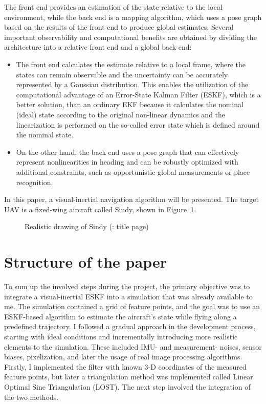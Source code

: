 The front end provides an estimation of the state relative to the local environment, while the back end is a mapping algorithm, which uses a pose graph based on the results of the front end to produce global estimates. Several important observability and computational benefits are obtained by dividing the architecture into a relative front end and a global back end:
\begin{itemize}
    \item 
    The front end calculates the estimate relative to a local frame, where the states can remain observable and the uncertainty can be accurately represented by a Gaussian distribution. This enables the utilization of the computational advantage of an Error-State Kalman Filter (ESKF), which is a better solution, than an ordinary EKF because it calculates the nominal (ideal) state according to the original non-linear dynamics and the linearization is performed on the so-called error state which is defined around the nominal state.
    
    \item 
     On the other hand, the back end uses a pose graph that can effectively represent nonlinearities in heading and can be robustly optimized with additional constraints, such as opportunistic global measurements or place recognition.
\end{itemize}

In this paper, a visual-inertial navigation algorithm will be presented. The target UAV is a fixed-wing aircraft called Sindy, shown in Figure~\ref{fig:sindy}.

\begin{figure}[!ht]
    \centering
    
    \caption{Realistic drawing of Sindy (\cite{sindy-manual}: title page)}\label{fig:sindy}
\end{figure}

\section{Structure of the paper}

To sum up the involved steps during the project, the primary objective was to integrate a visual-inertial ESKF into a simulation that was already available to me. The simulation contained a grid of feature points, and the goal was to use an ESKF-based algorithm to estimate the aircraft's state while flying along a predefined trajectory. I followed a gradual approach in the development process, starting with ideal conditions and incrementally introducing more realistic elements to the simulation. These included IMU- and measurement- noises, sensor biases, pixelization, and later the usage of real image processing algorithms. Firstly, I implemented the filter with known 3-D coordinates of the measured feature points, but later a triangulation method was implemented called Linear Optimal Sine Triangulation (LOST). The next step involved the integration of the two methods. 

